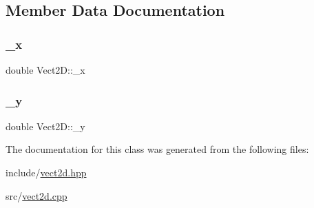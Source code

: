 \subsection{Member Data Documentation}
\mbox{\label{classVect2D_aa41c2c1afe6d0ac0cf18b5fdc9e98721_aa41c2c1afe6d0ac0cf18b5fdc9e98721}} 
\subsubsection{\texorpdfstring{\+\_\+x}{\_x}}
{\footnotesize\ttfamily double Vect2\+D\+::\+\_\+x\hspace{0.3cm}{\ttfamily [private]}}

\mbox{\label{classVect2D_a0191f309063b9219ea38d5eb24e55e42_a0191f309063b9219ea38d5eb24e55e42}} 
\subsubsection{\texorpdfstring{\+\_\+y}{\_y}}
{\footnotesize\ttfamily double Vect2\+D\+::\+\_\+y\hspace{0.3cm}{\ttfamily [private]}}



The documentation for this class was generated from the following files\+:\begin{DoxyCompactItemize}
\item 
include/\hyperlink{vect2d_8hpp}{vect2d.\+hpp}\item 
src/\hyperlink{vect2d_8cpp}{vect2d.\+cpp}\end{DoxyCompactItemize}
